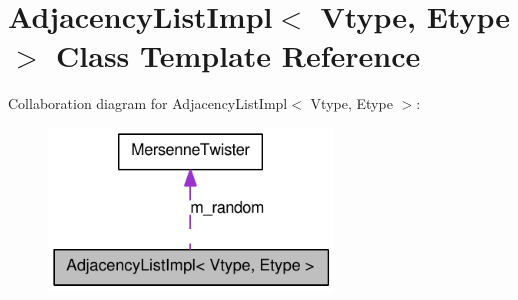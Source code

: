 \hypertarget{class_adjacency_list_impl}{
\section{AdjacencyListImpl$<$ Vtype, Etype $>$ Class Template Reference}
\label{class_adjacency_list_impl}
}


Collaboration diagram for AdjacencyListImpl$<$ Vtype, Etype $>$:\nopagebreak
\begin{figure}[H]
\begin{center}
\leavevmode
\includegraphics[width=214pt]{class_adjacency_list_impl__coll__graph}
\end{center}
\end{figure}
